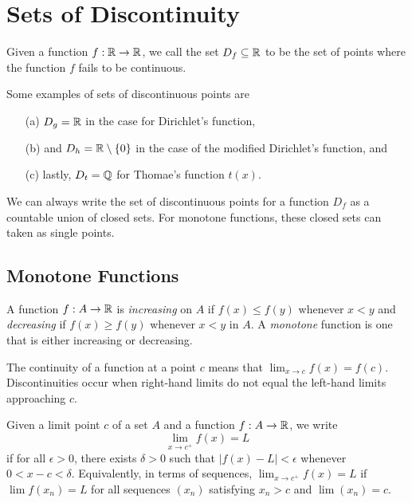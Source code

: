 \section{Sets of Discontinuity} 

\begin{definition}
Given a function \( f: \mathbb{R} \to \mathbb{R}  \), we call the set \( D_f \subseteq \mathbb{R}  \) to be the set of points where the function \( f  \) fails to be continuous.
\end{definition}

Some examples of sets of discontinuous points are
\begin{enumerate}
    \item[(a)] \( D_g = \mathbb{R}  \) in the case for Dirichlet's function, 
    \item[(b)] and \( D_{h} = \mathbb{R} \setminus \{ 0 \}  \) in the case of the modified Dirichlet's function, and 
    \item[(c)] lastly, \( D_{t} = \mathbb{Q}  \) for Thomae's function \( t(x)  \).
\end{enumerate}

We can always write the set of discontinuous points for a function \( D_f  \) as a countable union of closed sets. For monotone functions, these closed sets can taken as single points.

\subsection{Monotone Functions}

\begin{definition}
A function \( f: A \to \mathbb{R}  \) is \textit{increasing} on \( A \) if \( f(x) \leq f(y)  \) whenever \( x < y  \) and \textit{decreasing} if \( f(x) \geq f(y)  \) whenever \( x < y  \) in \( A  \). A \textit{monotone} function is one that is either increasing or decreasing.
\end{definition}

The continuity of a function at a point \( c  \) means that \( \lim_{ x \to c } f(x) = f(c) \). Discontinuities occur when right-hand limits do not equal the left-hand limits approaching \( c  \). 

\begin{definition}
Given a limit point \( c  \) of a set \( A  \) and a function \( f: A \to \mathbb{R}  \), we write
\[ \lim_{ x \to c^{+}   }  f(x) = L \]
if for all \( \epsilon > 0  \), there exists \( \delta > 0  \) such that \( | f(x) -  L  | < \epsilon  \) whenever \( 0 < x - c < \delta  \). Equivalently, in terms of sequences, \( \lim_{ x  \to c^{+} } f(x) = L  \) if \( \lim f(x_n) = L  \) for all sequences \( (x_n)  \) satisfying \( x_n >  c  \) and \( \lim (x_n) = c  \).
\end{definition}

